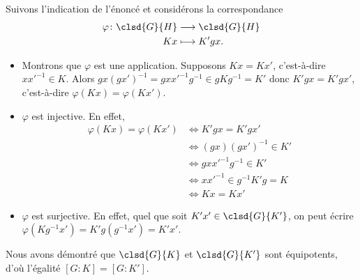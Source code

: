 Suivons l'indication de l'énoncé et considérons la correspondance
%
\begin{align*}
  \varphi\colon\clsd{G}{H} &\longrightarrow\clsd{G}{H} \\
                        Kx &\longmapsto K'gx.
\end{align*}
%
\begin{itemize}
  \item 
    Montrons que $\varphi$ est une application. Supposons $Kx = Kx'$,
    c'est-à-dire $xx'^{-1}\in K$. Alors 
    $gx(gx')^{-1} = gxx'^{-1}g^{-1} \in gKg^{-1} = K'$ donc $K'gx=K'gx'$,
    c'est-à-dire $\varphi(Kx)=\varphi(Kx')$. 

  \item
    $\varphi$ est injective. En effet,
    \begin{align*} 
      \varphi(Kx) = \varphi(Kx')
        &\iff K'gx = K'gx'\\ 
        &\iff (gx)(gx')^{-1} \in K'\\ 
        &\iff gxx'^{-1}g^{-1} \in K'\\ 
        &\iff xx'^{-1} \in g^{-1}K'g = K\\ 
        &\iff Kx = Kx' 
    \end{align*} 
  \item 
    $\varphi$ est surjective. En effet, quel que soit
    $K'x' \in \clsd{G}{K'}$, on peut écrire 
    $\varphi(Kg^{-1}x') = K'g(g^{-1}x') = K'x'$.
\end{itemize}

Nous avons démontré que $\clsd{G}{K}$ et $\clsd{G}{K'}$ sont équipotents, d'où
l'égalité $[G:K]=[G:K']$.
